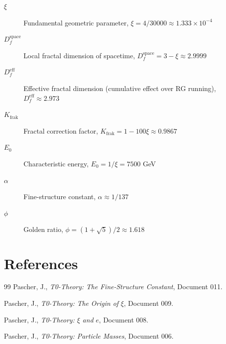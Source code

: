 	\begin{description}
		\item[$\xi$] Fundamental geometric parameter, $\xi = 4/30000 \approx 1.333 \times 10^{-4}$
		\item[$D_f^{\text{space}}$] Local fractal dimension of spacetime, $D_f^{\text{space}} = 3 - \xi \approx 2.9999$
		\item[$D_f^{\text{eff}}$] Effective fractal dimension (cumulative effect over RG running), $D_f^{\text{eff}} \approx 2.973$
		\item[$K_{\text{frak}}$] Fractal correction factor, $K_{\text{frak}} = 1 - 100\xi \approx 0.9867$
		\item[$E_0$] Characteristic energy, $E_0 = 1/\xi = 7500$ GeV
		\item[$\alpha$] Fine-structure constant, $\alpha \approx 1/137$
		\item[$\phi$] Golden ratio, $\phi = (1+\sqrt{5})/2 \approx 1.618$
	\end{description}
	
	\section{References}
	
	\begin{thebibliography}{99}
		Pascher, J., \emph{T0-Theory: The Fine-Structure Constant}, Document 011.
		
		Pascher, J., \emph{T0-Theory: The Origin of $\xi$}, Document 009.
		
		Pascher, J., \emph{T0-Theory: $\xi$ and $e$}, Document 008.
		
		Pascher, J., \emph{T0-Theory: Particle Masses}, Document 006.
		
	\end{thebibliography}
	